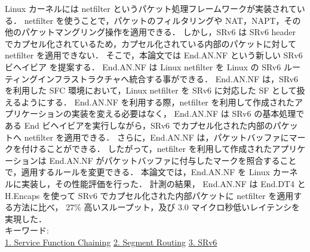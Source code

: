 Linux カーネルには netfilter というパケット処理フレームワークが実装されている．
netfilter を使うことで，パケットのフィルタリングや NAT，NAPT，その他のパケットマングリング操作を適用できる．
しかし，SRv6 は SRv6 header でカプセル化されているため，カプセル化されている内部のパケットに対して netfilter を適用できない．
そこで，本論文では End.AN.NF という新しい SRv6 ビヘイビア を提案する．
End.AN.NF は Linux netfilter を Linux の SRv6 ルーティングインフラストラクチャへ統合する事ができる．
End.AN.NF は，SRv6 を利用した SFC 環境において，Linux netfilter を SRv6 に対応した SF として扱えるようにする．
End.AN.NF を利用する際，netfilter を利用して作成されたアプリケーションの実装を変える必要はなく，
End.AN.NF は SRv6 の基本処理である End ビヘイビアを実行しながら，SRv6 でカプセル化された内部のパケットへ netfilter を適用できる．
さらに，End.AN.NF は，パケットバッファにマークを付けることができる．
したがって，netfilter を利用して作成されたアプリケーションは End.AN.NF がパケットバッファに付与したマークを照合することで，適用するルールを変更できる．
本論文では，End.AN.NF を Linux カーネルに実装し，その性能評価を行った．
計測の結果， End.AN.NF は End.DT4 と H.Encaps を使って SRv6 でカプセル化された内部パケットに netfilter を適用する方法に比べ，
27\% 高いスループット，及び 3.0 マイクロ秒低いレイテンシを実現した．
~ \\
キーワード:\\
\underline{1. Service Function Chaining}
\underline{2. Segment Routing}
\underline{3. SRv6}
\begin{flushright}
\dept \\
\author
\end{flushright}
